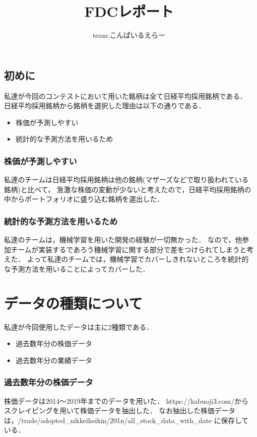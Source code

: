 \documentclass{jsarticle}
\begin{document}
\title{FDCレポート}
\author{team:こんぱいるえらー}
\maketitle

\subsection{初めに}

私達が今回のコンテストにおいて用いた銘柄は全て日経平均採用銘柄である．
日経平均採用銘柄から銘柄を選択した理由は以下の通りである．

\begin{itemize}
\item 株価が予測しやすい
\item 統計的な予測方法を用いるため
\end{itemize}

\subsubsection{株価が予測しやすい}
私達のチームは日経平均採用銘柄は他の銘柄(マザーズなどで取り扱われている銘柄)と比べて，
急激な株価の変動が少ないと考えたので，日経平均採用銘柄の中からポートフォリオに盛り込む銘柄を選出した．

\subsubsection{統計的な予測方法を用いるため}
私達のチームは，機械学習を用いた開発の経験が一切無かった．
なので，他参加チームが実装するであろう機械学習に関する部分で差をつけられてしまうと考えた．
よって私達のチームでは，機械学習でカバーしきれないところを統計的な予測方法を用いることによってカバーした．

\section{データの種類について}
私達が今回使用したデータは主に2種類である．
\begin{itemize}
\item 過去数年分の株価データ
\item 過去数年分の業績データ
\end{itemize}

\subsubsection{過去数年分の株価データ}
株価データは2014〜2019年までのデータを用いた．
https:\slash{}\slash{}kabuoji3.com\slash からスクレイピングを用いて株価データを抽出した．
なお抽出した株価データは，\slash{}trade\slash{}adopted\_nikkeiheikin\slash{}201n\slash{}all\_stock\_data\_with\_date に保存している．
\end{document}
